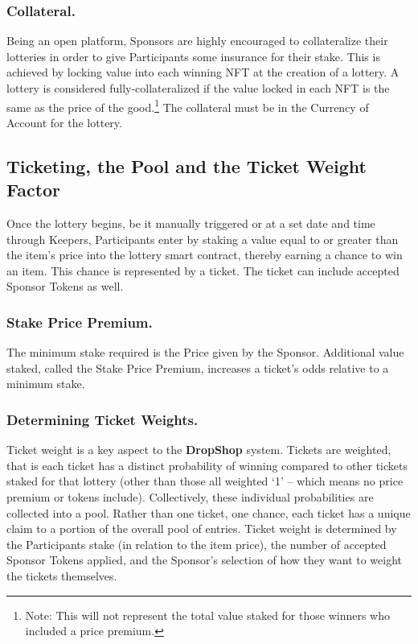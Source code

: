 \documentclass[runningheads]{llncs}
\begin{document}
\subsubsection{Collateral.}  Being an open platform, Sponsors are highly encouraged to collateralize their lotteries in order to give Participants some insurance for their stake.  This is achieved by locking value into each winning NFT at the creation of a lottery. A lottery is considered fully-collateralized if the value locked in each NFT is the same as the price of the good.\footnote{Note: This will not represent the total value staked for those winners who included a price premium.}   The collateral must be in the Currency of Account for the lottery.  

\subsection{Ticketing, the Pool and the Ticket Weight Factor}\label{subsection-Ticketing}
Once the lottery begins, be it manually triggered or at a set date and time through Keepers, Participants enter by staking a value equal to or greater than the item’s price into the lottery smart contract, thereby earning a chance to win an item.  This chance is represented by a ticket.  The ticket can include accepted Sponsor Tokens as well.  

\subsubsection{Stake Price Premium.}  The minimum stake required is the Price given by the Sponsor.  Additional value staked, called the Stake Price Premium, increases a ticket’s odds relative to a minimum stake.

\subsubsection{Determining Ticket Weights.} Ticket weight is a key aspect to the \textbf{DropShop} system.  Tickets are weighted, that is each ticket has a distinct probability of winning compared to other tickets staked for that lottery (other than those all weighted ‘1’ – which means no price premium or tokens include).  Collectively, these individual probabilities are collected into a pool.  Rather than one ticket, one chance, each ticket has a unique claim to a portion of the overall pool of entries. Ticket weight is determined by the Participants stake (in relation to the item price), the number of accepted Sponsor Tokens applied, and the Sponsor’s selection of how they want to weight the tickets themselves.
\end{document}
